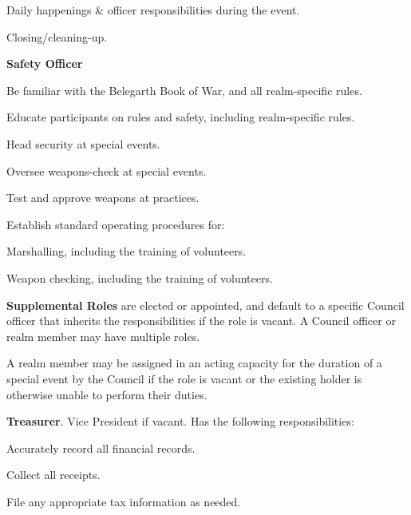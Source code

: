 \documentclass[12pt]{article}
\begin{document}
\begin{level}
\begin{level}
\begin{level}
\begin{level}
                \item Daily happenings \& officer responsibilities during the event.
                \item Closing/cleaning-up.
            \end{level}
        \end{level}
        \item \textbf{Safety Officer}
        \begin{level}
            \item Be familiar with the Belegarth Book of War, and all realm-specific rules.
            \item Educate participants on rules and safety, including realm-specific rules. 
            \item Head security at special events.
            \item Oversee weapons-check at special events.
            \item Test and approve weapons at practices.
            \item Establish standard operating procedures for:
            \begin{level}
                \item Marshalling, including the training of volunteers.
                \item Weapon checking, including the training of volunteers.
            \end{level}
        \end{level}
\end{level}
\item \textbf{Supplemental Roles} are elected or appointed, and default to a specific Council officer that inherits the responsibilities if the role is vacant. A Council officer or realm member may have multiple roles.
\begin{level}
    \item A realm member may be assigned in an acting capacity for the duration of a special event by the Council if the role is vacant or the existing holder is otherwise unable to perform their duties.
    \item \textbf{Treasurer}. Vice President if vacant. Has the following responsibilities:
    \begin{level}
        \item Accurately record all financial records.
        \item Collect all receipts.
        \item File any appropriate tax information as needed.

\end{level}
\end{level}
\end{level}
\end{document}
